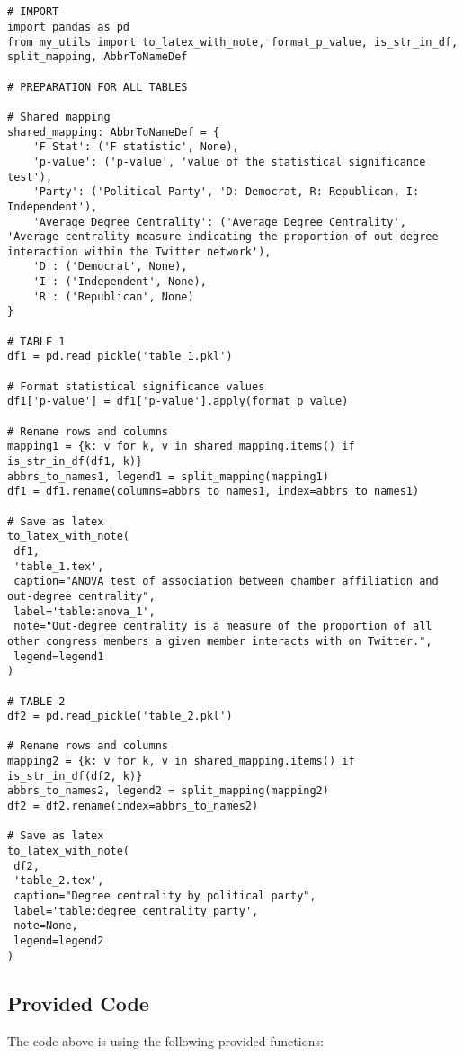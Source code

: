 \documentclass[11pt]{article}
\begin{document}
\begin{verbatim}


# IMPORT
import pandas as pd
from my_utils import to_latex_with_note, format_p_value, is_str_in_df, split_mapping, AbbrToNameDef

# PREPARATION FOR ALL TABLES

# Shared mapping
shared_mapping: AbbrToNameDef = {
    'F Stat': ('F statistic', None),
    'p-value': ('p-value', 'value of the statistical significance test'),
    'Party': ('Political Party', 'D: Democrat, R: Republican, I: Independent'),
    'Average Degree Centrality': ('Average Degree Centrality', 'Average centrality measure indicating the proportion of out-degree interaction within the Twitter network'),
    'D': ('Democrat', None),
    'I': ('Independent', None),
    'R': ('Republican', None)
}

# TABLE 1
df1 = pd.read_pickle('table_1.pkl')

# Format statistical significance values
df1['p-value'] = df1['p-value'].apply(format_p_value)

# Rename rows and columns
mapping1 = {k: v for k, v in shared_mapping.items() if is_str_in_df(df1, k)}
abbrs_to_names1, legend1 = split_mapping(mapping1)
df1 = df1.rename(columns=abbrs_to_names1, index=abbrs_to_names1)

# Save as latex
to_latex_with_note(
 df1, 
 'table_1.tex',
 caption="ANOVA test of association between chamber affiliation and out-degree centrality", 
 label='table:anova_1',
 note="Out-degree centrality is a measure of the proportion of all other congress members a given member interacts with on Twitter.",
 legend=legend1
)

# TABLE 2
df2 = pd.read_pickle('table_2.pkl')

# Rename rows and columns
mapping2 = {k: v for k, v in shared_mapping.items() if is_str_in_df(df2, k)}
abbrs_to_names2, legend2 = split_mapping(mapping2)
df2 = df2.rename(index=abbrs_to_names2)

# Save as latex
to_latex_with_note(
 df2, 
 'table_2.tex',
 caption="Degree centrality by political party", 
 label='table:degree_centrality_party',
 note=None,
 legend=legend2
)

\end{verbatim}

\subsection{Provided Code}
The code above is using the following provided functions:
\end{document}
